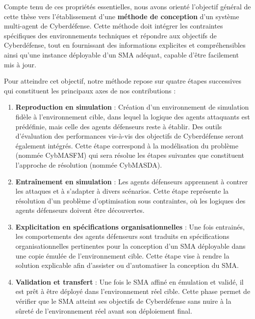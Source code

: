 Compte tenu de ces propriétés essentielles, nous avons orienté l’objectif général de cette thèse vers l'établissement d'une \textbf{méthode de conception} d’un système multi-agent de Cyberdéfense. Cette méthode doit intégrer les contraintes spécifiques des environnements techniques et répondre aux objectifs de Cyberdéfense, tout en fournissant des informations explicites et compréhensibles ainsi qu'une instance déployable d'un SMA adéquat, capable d’être facilement mis à jour.

Pour atteindre cet objectif, notre méthode repose sur quatre étapes successives qui constituent les principaux axes de nos contributions :

\begin{enumerate}
    \item \textbf{Reproduction en simulation} : Création d’un environnement de simulation fidèle à l’environnement cible, dans lequel la logique des agents attaquants est prédéfinie, mais celle des agents défenseurs reste à établir. Des outils d’évaluation des performances vis-à-vis des objectifs de Cyberdéfense seront également intégrés. Cette étape correspond à la modélisation du problème (nommée CybMASFM) qui sera résolue les étapes suivantes que constituent l'approche de résolution (nommée CybMASDA).
    
    \item \textbf{Entraînement en simulation} : Les agents défenseurs apprennent à contrer les attaques et à s’adapter à divers scénarios. Cette étape représente la résolution d’un problème d'optimisation sous contraintes, où les logiques des agents défenseurs doivent être découvertes.
    
    \item \textbf{Explicitation en spécifications organisationnelles} : Une fois entrainés, les comportements des agents défenseurs sont traduits en spécifications organisationnelles pertinentes pour la conception d’un SMA déployable dans une copie émulée de l’environnement cible. Cette étape vise à rendre la solution explicable afin d’assister ou d’automatiser la conception du SMA.
    
    \item \textbf{Validation et transfert} : Une fois le SMA affiné en émulation et validé, il est prêt à être déployé dans l’environnement réel cible. Cette phase permet de vérifier que le SMA atteint ses objectifs de Cyberdéfense sans nuire à la sûreté de l’environnement réel avant son déploiement final.
\end{enumerate}

